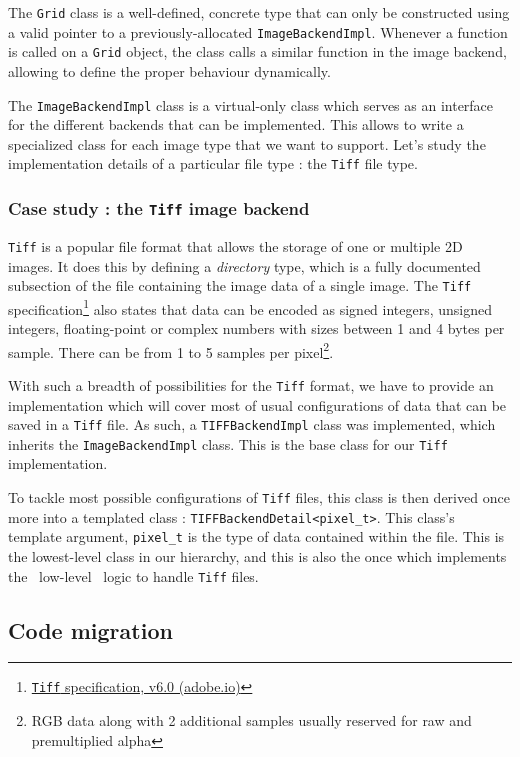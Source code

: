 {{		\myparspace

		The \texttt{Grid} class is a well-defined, concrete type that can only be constructed using a valid pointer to a previously-allocated \texttt{ImageBackendImpl}. Whenever a function is called on a \texttt{Grid} object, the class calls a similar function in the image backend, allowing to define the proper behaviour dynamically.\par
		The \texttt{ImageBackendImpl} class is a virtual-only class which serves as an interface for the different backends that can be implemented. This allows to write a specialized class for each image type that we want to support. Let's study the implementation details of a particular file type : the \texttt{Tiff} file type.

		\subsubsection{Case study : the \texttt{Tiff} image backend}
		{
			\texttt{Tiff} is a popular file format that allows the storage of one or multiple 2D images. It does this by defining a \textit{directory} type, which is a fully documented subsection of the file containing the image data of a single image. The \texttt{Tiff} specification\footnote{\href{https://www.adobe.io/content/dam/udp/en/open/standards/tiff/TIFF6.pdf}{\texttt{Tiff} specification, v6.0 (adobe.io)}} also states that data can be encoded as signed integers, unsigned integers, floating-point or complex numbers with sizes between 1 and 4 bytes per sample. There can be from 1 to 5 samples per pixel\footnote{RGB data along with 2 additional samples usually reserved for raw and premultiplied alpha}.

			With such a breadth of possibilities for the \texttt{Tiff} format, we have to provide an implementation which will cover most of usual configurations of data that can be saved in a \texttt{Tiff} file. As such, a \texttt{TIFFBackendImpl} class was implemented, which inherits the \texttt{ImageBackendImpl} class. This is the base class for our \texttt{Tiff} implementation.\par
			To tackle most possible configurations of \texttt{Tiff} files, this class is then derived once more into a templated class : \texttt{TIFFBackendDetail<pixel\_t>}. This class's template argument, \texttt{pixel\_t} is the type of data contained within the file. This is the lowest-level class in our hierarchy, and this is also the once which implements the \guillemotleft{}~low-level~\guillemotright{} logic to handle \texttt{Tiff} files.\par
		}
	}

	\subsection{Code migration}\label{text:03_software_components:01_image_representation:03_migration}
	{
	}
}

